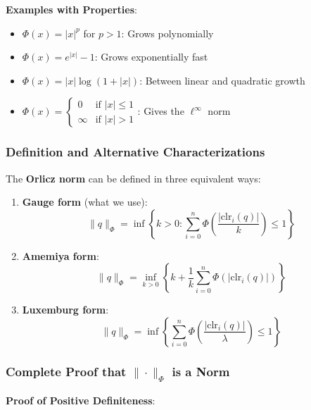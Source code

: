 \documentclass{amsart}
\theoremstyle{plain}
\theoremstyle{definition}
\theoremstyle{remark}
\begin{document}
\textbf{Examples with Properties}:

\begin{itemize}
	\item $\Phi(x) = |x|^p$ for $p > 1$: Grows polynomially
	\item $\Phi(x) = e^{|x|} - 1$: Grows exponentially fast
	\item $\Phi(x) = |x| \log(1 + |x|)$: Between linear and quadratic growth
	\item $\Phi(x) = \begin{cases} 0 & \text{if } |x| \leq 1 \\ \infty & \text{if } |x| > 1 \end{cases}$: Gives the $\ell^\infty$ norm
\end{itemize}

\subsubsection{Definition and Alternative Characterizations}

The \textbf{Orlicz norm} can be defined in three equivalent ways:

\begin{enumerate}
	\item \textbf{Gauge form} (what we use):
\[
\|q\|_\Phi = \inf \left\{ k > 0 : \sum_{i=0}^n \Phi\left(\frac{|\text{clr}_i(q)|}{k}\right) \leq 1 \right\}
\]
	\item \textbf{Amemiya form}:
\[
\|q\|_\Phi = \inf_{k > 0} \left\{ k + \frac{1}{k} \sum_{i=0}^n \Phi(|\text{clr}_i(q)|) \right\}
\]
	\item \textbf{Luxemburg form}:
\[
\|q\|_\Phi = \inf \left\{ \sum_{i=0}^n \Phi\left(\frac{|\text{clr}_i(q)|}{\lambda}\right) \leq 1 \right\}
\]
\end{enumerate}

\subsubsection{Complete Proof that \texorpdfstring{$\|\cdot\|_\Phi$}{|cdot|_Phi} is a Norm}

\textbf{Proof of Positive Definiteness}:
\end{document}
